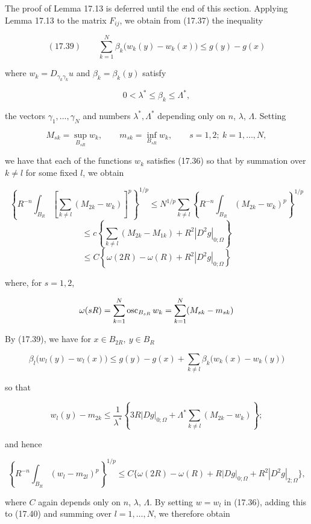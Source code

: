 The proof of Lemma 17.13 is deferred until the end of this section. Applying Lemma 17.13 to the matrix $F_{ij}$, we obtain from (17.37) the inequality

\[
(17.39)\qquad \sum_{k=1}^{N}\beta_k\bigl(w_k(y)-w_k(x)\bigr)\leq g(y)-g(x)
\]

where $w_k=D_{\gamma_k\gamma_k}u$ and $\beta_k=\beta_k(y)$ satisfy

\[
0<\lambda^{*}\leq \beta_k\leq \Lambda^{*},
\]

the vectors $\gamma_1,\ldots,\gamma_N$ and numbers $\lambda^{*},\Lambda^{*}$ depending only on $n$, $\lambda$, $\Lambda$. Setting

\[
M_{sk}=\sup_{B_{sR}} w_k,\qquad m_{sk}=\inf_{B_{sR}} w_k,\qquad s=1,2;\ k=1,\ldots,N,
\]

we have that each of the functions $w_k$ satisfies (17.36) so that by summation over $k\neq l$ for some fixed $l$, we obtain

\[
\left\{R^{-n}\int_{B_R}\left[\sum_{k\neq l}(M_{2k}-w_k)\right]^{p}\right\}^{1/p}
\leq N^{1/p}\sum_{k\neq l}\left\{R^{-n}\int_{B_R}(M_{2k}-w_k)^{p}\right\}^{1/p}
\]
\[
\leq c\left\{\sum_{k\neq l}(M_{2k}-M_{1k})+R^2|D^2g|_{0;\Omega}\right\}
\]
\[
\leq C\left\{\omega(2R)-\omega(R)+R^2|D^2g|_{0;\Omega}\right\}
\]

where, for $s=1,2$,

\[
\omega(sR)=\sum_{k=1}^{N}\osc_{B_{sR}} w_k=\sum_{k=1}^{N}(M_{sk}-m_{sk})
\]

By (17.39), we have for $x\in B_{2R},\ y\in B_R$

\[
\beta_l\bigl(w_l(y)-w_l(x)\bigr)\leq g(y)-g(x)+\sum_{k\neq l}\beta_k\bigl(w_k(x)-w_k(y)\bigr)
\]


\providecommand{\osc}{\operatorname{osc}}
\providecommand{\D}{D}
\providecommand{\R}{\mathbb{R}}
\providecommand{\I}{I}
\providecommand{\g}{g}
\providecommand{\w}{\omega}
\providecommand{\Br}[1]{B_{#1}}

so that

\[
w_l(y)-m_{2k}\le \frac{1}{\lambda^*}\left\{3R|Dg|_{0;\Omega}+\Lambda^*\sum_{k\ne l}(M_{2k}-w_k)\right\};
\]

and hence

\begin{equation}\tag{17.40}
\left\{R^{-n}\int_{B_R}(w_l-m_{2l})^p\right\}^{1/p}
\le C\{ \omega(2R)-\omega(R)+R|Dg|_{0;\Omega}+R^2|D^2g|_{2;\Omega}\},
\end{equation}

where $C$ again depends only on $n$, $\lambda$, $\Lambda$. By setting $w=w_l$ in (17.36), adding this to (17.40) and summing over $l=1,\ldots,N$, we therefore obtain

